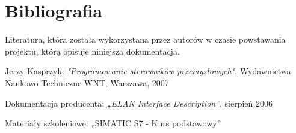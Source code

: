 \section{Bibliografia}
Literatura, która została wykorzystana przez autorów w czasie powstawania projektu, którą opisuje niniejsza dokumentacja.

\begin{thebibliography}{9}
{} 
Jerzy Kasprzyk: 
\emph{"Programowanie sterowników przemysłowych"},
Wydawnictwa Naukowo-Techniczne WNT, 
Warszawa, 
2007      

Dokumentacja producenta: 
\emph{„ELAN Interface Description”}, 
sierpień 2006

Materiały szkoleniowe:
„SIMATIC S7 - Kurs podstawowy”

\end{thebibliography}